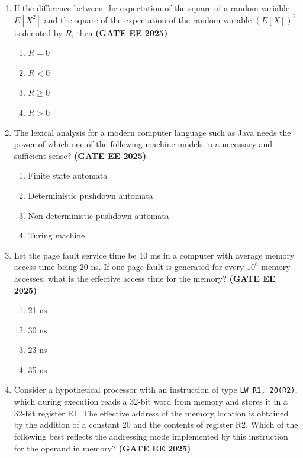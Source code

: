 \documentclass[journal,12pt,onecolumn]{IEEEtran}
\theoremstyle{remark}
\begin{document}
\begin{enumerate}
\item If the difference between the expectation of the square of a random variable $ E[X^2] $ and the square of the expectation of the random variable $ (E[X])^2 $ is denoted by $ R $, then \hfill \textbf{(GATE EE 2025)}

\begin{enumerate}
  \item $ R = 0 $
  \item $ R < 0 $
  \item $ R \geq 0 $
  \item $ R > 0 $
\end{enumerate}


\item The lexical analysis for a modern computer language such as Java needs the power of which one of the following machine models in a necessary and sufficient sense? \hfill \textbf{(GATE EE 2025)}

\begin{enumerate}
  \item Finite state automata
  \item Deterministic pushdown automata
  \item Non-deterministic pushdown automata
  \item Turing machine
\end{enumerate}




\item Let the page fault service time be 10 ms in a computer with average memory access time being 20 ns. If one page fault is generated for every $ 10^6 $ memory accesses, what is the effective access time for the memory? \hfill \textbf{(GATE EE 2025)}

\begin{enumerate}
  \item 21 ns
  \item  30 ns
  \item 23 ns
  \item 35 ns
\end{enumerate}




\item Consider a hypothetical processor with an instruction of type \texttt{LW R1, 20(R2)}, which during execution reads a 32-bit word from memory and stores it in a 32-bit register R1. The effective address of the memory location is obtained by the addition of a constant 20 and the contents of register R2. Which of the following best reflects the addressing mode implemented by this instruction for the operand in memory? \hfill \textbf{(GATE EE 2025)}


\end{enumerate}
\end{document}
